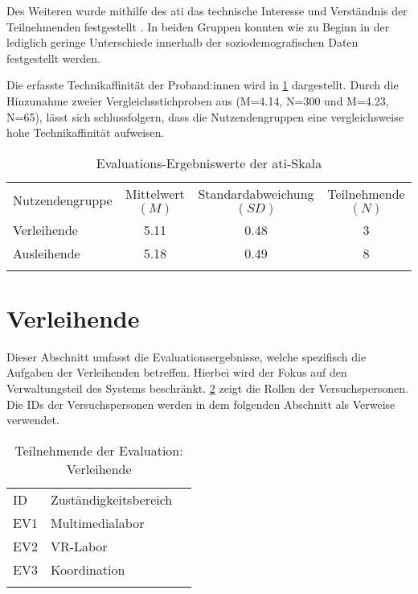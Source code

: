 Des Weiteren wurde mithilfe des \ac{ati} das technische Interesse und Verständnis der Teilnehmenden
festgestellt \cite{attig_assessing_2017}. In beiden Gruppen konnten wie zu Beginn in der
 lediglich geringe Unterschiede innerhalb der soziodemografischen Daten
festgestellt werden.

Die erfasste Technikaffinität der Proband:innen wird in \ref{table:atipartzwei} dargestellt. Durch
die Hinzunahme zweier Vergleichsstichproben aus  (M=4.14, N=300 und
M=4.23, N=65), lässt sich schlussfolgern, dass die Nutzendengruppen eine vergleichsweise hohe
Technikaffinität aufweisen.

\begin{table}[h]
        \centering
        \caption{Evaluations-Ergebniswerte der \ac{ati}-Skala}
        \begin{tabular}{lccc}
                \arrayrulecolor{maincolor}\hline
                \sffamily\color{maincolor}Nutzendengruppe           &
                \sffamily\color{maincolor}Mittelwert $(M)$          &
                \sffamily\color{maincolor}Standardabweichung $(SD)$ &
                \sffamily\color{maincolor}Teilnehmende $(N)$                          \\
                \arrayrulecolor{maincolor}\hline
                Verleihende                                         & 5.11 & 0.48 & 3 \\
                Ausleihende                                         & 5.18 & 0.49 & 8 \\
                \arrayrulecolor{maincolor}\hline
        \end{tabular}
        \label{table:atipartzwei}
\end{table}

\section{Verleihende}
\label{sec:ev-ver}
Dieser Abschnitt umfasst die Evaluationsergebnisse, welche spezifisch die Aufgaben der Verleihenden
betreffen. Hierbei wird der Fokus auf den Verwaltungsteil des Systems beschränkt. \ref{table:vzwei}
zeigt die Rollen der Versuchspersonen. Die IDs der Versuchspersonen werden in dem folgenden
Abschnitt als Verweise verwendet.
\begin{table}[h]
        \centering
        \caption{Teilnehmende der Evaluation: Verleihende}
        \begin{tabular}{lll}
                \arrayrulecolor{maincolor}\hline
                \sffamily\color{maincolor}ID &
                \sffamily\color{maincolor}Zuständigkeitsbereich \\
                \arrayrulecolor{maincolor}\hline
                EV1                          & Multimedialabor  \\
                EV2                          & VR-Labor         \\
                EV3                          & Koordination               \\
                \arrayrulecolor{maincolor}\hline
        \end{tabular}
        \label{table:vzwei}
\end{table}

